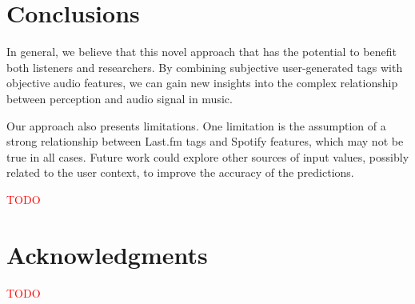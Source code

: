 \documentclass[sn-mathphys]{sn-jnl}%
\theoremstyle{thmstyleone}%
\theoremstyle{thmstyletwo}%
\theoremstyle{thmstylethree}%
\begin{document}
\section{Conclusions}

In general, we believe that this novel approach that has the potential to benefit both listeners and researchers.
By combining subjective user-generated tags with objective audio features,
we can gain new insights into the complex relationship between perception and audio signal in music.

Our approach also presents limitations.
One limitation is the assumption of a strong relationship between Last.fm tags and Spotify features, which may not be true in all cases.
Future work could explore other sources of input values, possibly related to the user context, to improve the accuracy of the predictions.



\textcolor{red}{TODO}


\section{Acknowledgments}

\textcolor{red}{TODO}





\end{document}
